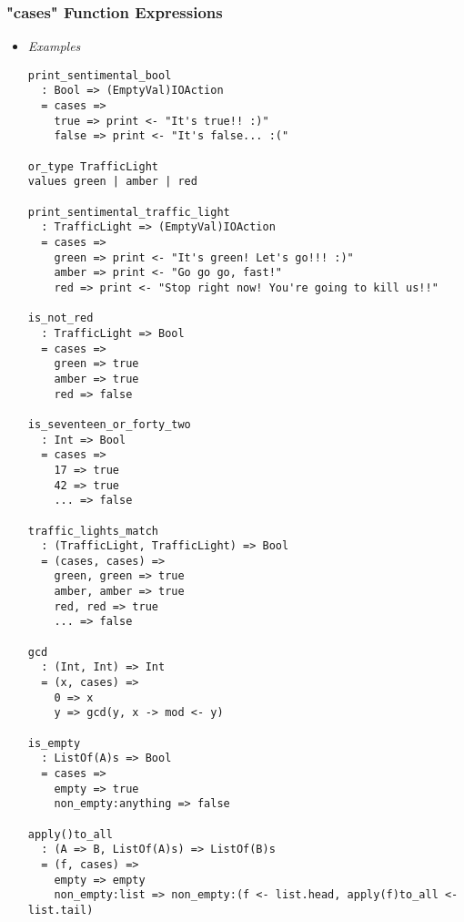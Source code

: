 \documentclass{article}
\begin{document}
\subsubsection{"cases" Function Expressions}
\label{subsubsec:casessyntax}

\begin{itemize}
\item \textit{Examples}

\begin{verbatim}
print_sentimental_bool
  : Bool => (EmptyVal)IOAction
  = cases =>
    true => print <- "It's true!! :)"
    false => print <- "It's false... :("

or_type TrafficLight
values green | amber | red

print_sentimental_traffic_light
  : TrafficLight => (EmptyVal)IOAction
  = cases =>
    green => print <- "It's green! Let's go!!! :)"
    amber => print <- "Go go go, fast!"
    red => print <- "Stop right now! You're going to kill us!!"

is_not_red
  : TrafficLight => Bool
  = cases =>
    green => true
    amber => true
    red => false

is_seventeen_or_forty_two
  : Int => Bool
  = cases => 
    17 => true
    42 => true
    ... => false
 
traffic_lights_match
  : (TrafficLight, TrafficLight) => Bool
  = (cases, cases) =>
    green, green => true
    amber, amber => true
    red, red => true
    ... => false

gcd
  : (Int, Int) => Int
  = (x, cases) =>
    0 => x
    y => gcd(y, x -> mod <- y) 

is_empty
  : ListOf(A)s => Bool
  = cases => 
    empty => true
    non_empty:anything => false

apply()to_all
  : (A => B, ListOf(A)s) => ListOf(B)s
  = (f, cases) =>
    empty => empty
    non_empty:list => non_empty:(f <- list.head, apply(f)to_all <- list.tail)

\end{verbatim}


\end{itemize}
\end{document}
